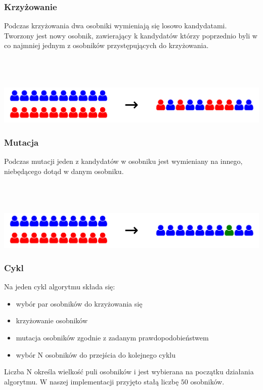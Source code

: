 \documentclass{beamer}
\begin{document}

\begin{frame}
\frametitle{Krzyżowanie}
Podczas krzyżowania dwa osobniki wymieniają się losowo kandydatami. Tworzony jest nowy osobnik, zawierający k kandydatów którzy poprzednio byli w co najmniej jednym z osobników przystępujących do krzyżowania.

~ \\ ~ \\ ~ \\

\includegraphics[width=0.8\paperwidth]{pics/crossing.png}

\end{frame}


\begin{frame}
\frametitle{Mutacja}
Podczas mutacji jeden z kandydatów w osobniku jest wymieniany na innego, niebędącego dotąd w danym osobniku.

~ \\ ~ \\ ~ \\

\includegraphics[width=0.8\paperwidth]{pics/mutation.png}

\end{frame}


\begin{frame}
\frametitle{Cykl}

Na jeden cykl algorytmu składa się:

\begin{itemize}
\item wybór par osobników do krzyżowania się
\item krzyżowanie osobników
\item mutacja osobników zgodnie z zadanym prawdopodobieństwem
\item wybór N osobników do przejścia do kolejnego cyklu
\end{itemize}

Liczba N określa wielkość puli osobników i jest wybierana na początku działania algorytmu. W naszej implementacji przyjęto stałą liczbę $50$ osobników.

\end{frame}
\end{document}
